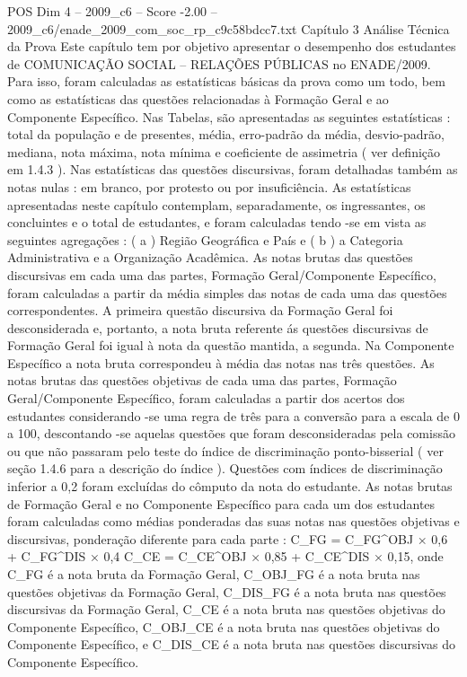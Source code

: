 \begin{textsample}{POS Dim 4 – 2009\_c6 – Score -2.00 – 2009\_c6/enade\_2009\_com\_soc\_rp\_c9c58bdcc7.txt}  \label{ex:f4_pos_320}
Capítulo 3 Análise Técnica da Prova Este capítulo tem por objetivo apresentar o desempenho dos estudantes de COMUNICAÇÃO SOCIAL – RELAÇÕES PÚBLICAS no ENADE/2009.
Para isso, foram calculadas as estatísticas básicas da prova como um todo, bem como as estatísticas das questões relacionadas à Formação Geral e ao Componente Específico.
Nas Tabelas, são apresentadas as seguintes estatísticas : total da população e de presentes, média, erro-padrão da média, desvio-padrão, mediana, nota máxima, nota mínima e coeficiente de assimetria ( ver definição em 1.4.3 ).
Nas estatísticas das questões discursivas, foram detalhadas também as notas nulas : em branco, por protesto ou por insuficiência.
As estatísticas apresentadas neste capítulo contemplam, separadamente, os ingressantes, os concluintes e o total de estudantes, e foram calculadas tendo -se em vista as seguintes agregações : ( a ) Região Geográfica e País e ( b ) a Categoria Administrativa e a Organização Acadêmica.
As notas brutas das questões discursivas em cada uma das partes, Formação Geral/Componente Específico, foram calculadas a partir da média simples das notas de cada uma das questões correspondentes.
A primeira questão discursiva da Formação Geral foi desconsiderada e, portanto, a nota bruta referente ás questões discursivas de Formação Geral foi igual à nota da questão mantida, a segunda.
Na Componente Específico a nota bruta correspondeu à média das notas nas três questões.
As notas brutas das questões objetivas de cada uma das partes, Formação Geral/Componente Específico, foram calculadas a partir dos acertos dos estudantes considerando -se uma regra de três para a conversão para a escala de 0 a 100, descontando -se aquelas questões que foram desconsideradas pela comissão ou que não passaram pelo teste do índice de discriminação ponto-bisserial ( ver seção 1.4.6 para a descrição do índice ).
Questões com índices de discriminação inferior a 0,2 foram excluídas do cômputo da nota do estudante.
As notas brutas de Formação Geral e no Componente Específico para cada um dos estudantes foram calculadas como médias ponderadas das suas notas nas questões objetivas e discursivas, ponderação diferente para cada parte : C\_FG = C\_FG\textasciicircum{}OBJ × 0,6 + C\_FG\textasciicircum{}DIS × 0,4 C\_CE = C\_CE\textasciicircum{}OBJ × 0,85 + C\_CE\textasciicircum{}DIS × 0,15, onde C\_FG é a nota bruta da Formação Geral, C\_OBJ\_FG é a nota bruta nas questões objetivas da Formação Geral, C\_DIS\_FG é a nota bruta nas questões discursivas da Formação Geral, C\_CE é a nota bruta nas questões objetivas do Componente Específico, C\_OBJ\_CE é a nota bruta nas questões objetivas do Componente Específico, e C\_DIS\_CE é a nota bruta nas questões discursivas do Componente Específico.

\end{textsample}
